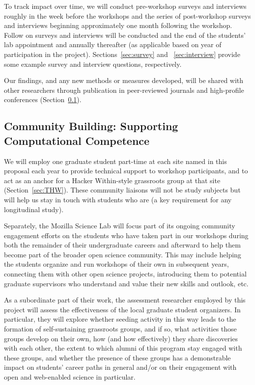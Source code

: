 \documentclass{proposalnsf}
\newlength{\up}
\begin{document}
To track impact over time, we will conduct pre-workshop surveys and
interviews roughly in the week before the workshops and the series of
post-workshop surveys and interviews beginning approximately one month
following the workshop. Follow on surveys and interviews will be
conducted and the end of the students' lab appointment and annually
thereafter (as applicable based on year of participation in the
project). Sections~\ref{sec:survey} and ~\ref{sec:interview} provide
some example survey and interview questions, respectively.

Our findings, and any new methods or measures developed, will be
shared with other researchers through publication in peer-reviewed
journals and high-profile conferences (Section~\ref{sec:pub}).

\subsection{Community Building: Supporting Computational Competence}
\label{sec:pub}

We will employ one graduate student part-time at each site named in
this proposal each year to provide technical support to workshop
participants, and to act as an anchor for a Hacker Within-style
grassroots group at that site (Section~\ref{sec:THW}).  These
community liaisons will not be study subjects but will help us stay in
touch with students who are (a key requirement for any longitudinal
study).

Separately, the Mozilla Science Lab will focus part of its ongoing
community engagement efforts on the students who have taken part in
our workshops during both the remainder of their undergraduate careers
and afterward to help them become part of the broader
open science community.  This may include helping the students
organize and run workshops of their own in subsequent years,
connecting them with other open science projects, introducing them to
potential graduate supervisors who understand and value their new
skills and outlook, etc.

As a subordinate part of their work, the assessment researcher employed by this 
project will assess the effectiveness of the local graduate student organizers.  
In particular, they will explore whether seeding activity in this way leads to 
the formation of self-sustaining grassroots groups, and if so, what activities 
those groups develop on their own, how (and how effectively) they share 
discoveries with each other, the extent to which alumni of this program stay 
engaged with these groups, and whether the presence of these groups has a 
demonstrable impact on students' career paths in general and/or on their 
engagement with open and web-enabled science in particular.
\end{document}
